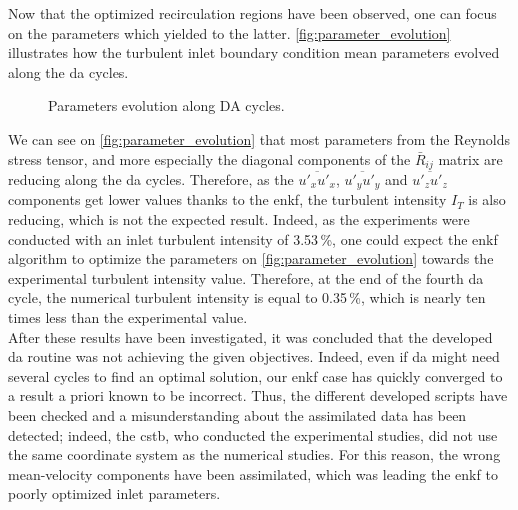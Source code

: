 \documentclass[12pt,twoside]{report}
\begin{document}
Now that the optimized recirculation regions have been observed, one can focus on the parameters which yielded to the latter. \autoref{fig:parameter_evolution} illustrates how the turbulent inlet boundary condition mean parameters evolved along the \gls{da} cycles.
\begin{figure}[h!]
    \centering
    
    \caption{Parameters evolution along DA cycles.}
    \label{fig:parameter_evolution}
\end{figure}

We can see on \autoref{fig:parameter_evolution} that most parameters from the Reynolds stress tensor, and more especially the diagonal components of the $\bar{R}_{ij}$ matrix are reducing along the \gls{da} cycles. Therefore, as the  $\overline{u'_x u'_x}$, $\overline{u'_y u'_y}$ and $\overline{u'_z u'_z}$ components get lower values thanks to the \gls{enkf}, the turbulent intensity $I_T$ is also reducing, which is not the expected result. Indeed, as the experiments were conducted with an inlet turbulent intensity of 3.53\,\%, one could expect the \gls{enkf} algorithm to optimize the parameters on \autoref{fig:parameter_evolution} towards the experimental turbulent intensity value. Therefore, at the end of the fourth \gls{da} cycle, the numerical turbulent intensity is equal to 0.35\,\%, which is nearly ten times less than the experimental value. \\

After these results have been investigated, it was concluded that the developed \gls{da} routine was not achieving the given objectives. Indeed, even if \gls{da} might need several cycles to find an optimal solution, our \gls{enkf} case has quickly converged to a result a priori known to be incorrect. Thus, the different developed scripts have been checked and a misunderstanding about the assimilated data has been detected; indeed, the \gls{cstb}, who conducted the experimental studies, did not use the same coordinate system as the numerical studies. For this reason, the wrong mean-velocity components have been assimilated, which was leading the \gls{enkf} to poorly optimized inlet parameters. 
\end{document}
